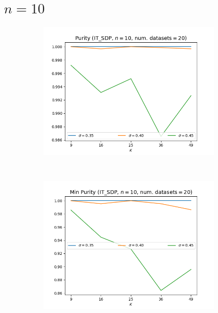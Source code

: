 \documentclass{article}
\begin{document}
\section{$n = 10$}
    \begin{figure}[h!]
        \centering
        \begin{subfigure}[t]{0.3\textwidth}
            \centering
            \includegraphics[width=\textwidth]{4/Purity.png}
            \caption{}
        \end{subfigure}%
        ~ 
        \begin{subfigure}[t]{0.3\textwidth}
            \centering
            \includegraphics[width=\textwidth]{4/MinPurity.png}
            \caption{}
        \end{subfigure}

\end{figure}
\end{document}
